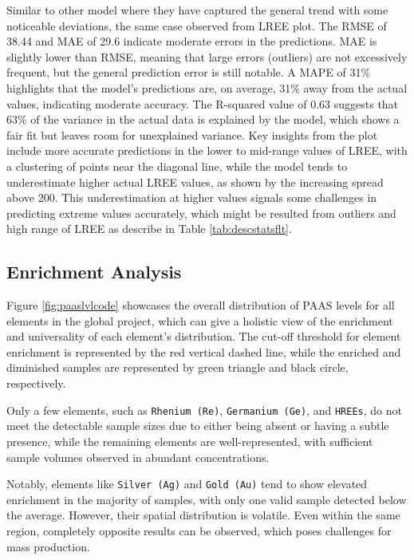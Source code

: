 \documentclass[11pt,a4paper,]{article}
\begin{document}
Similar to other model where they have captured the general trend with some noticeable deviations, the same case observed from LREE plot. The RMSE of 38.44 and MAE of 29.6 indicate moderate errors in the predictions. MAE is slightly lower than RMSE, meaning that large errors (outliers) are not excessively frequent, but the general prediction error is still notable. A MAPE of 31\% highlights that the model's predictions are, on average, 31\% away from the actual values, indicating moderate accuracy. The R-squared value of 0.63 suggests that 63\% of the variance in the actual data is explained by the model, which shows a fair fit but leaves room for unexplained variance. Key insights from the plot include more accurate predictions in the lower to mid-range values of LREE, with a clustering of points near the diagonal line, while the model tends to underestimate higher actual LREE values, as shown by the increasing spread above 200. This underestimation at higher values signals some challenges in predicting extreme values accurately, which might be resulted from outliers and high range of LREE as describe in Table \ref{tab:descstatsflt}.

\subsection{Enrichment Analysis}\label{enrichment-analysis-1}

Figure \ref{fig:paaslvlcode} showcases the overall distribution of PAAS levels for all elements in the global project, which can give a holistic view of the enrichment and universality of each element's distribution. The cut-off threshold for element enrichment is represented by the red vertical dashed line, while the enriched and diminished samples are represented by green triangle and black circle, respectively.

Only a few elements, such as \texttt{Rhenium\ (Re)}, \texttt{Germanium\ (Ge)}, and \texttt{HREEs}, do not meet the detectable sample sizes due to either being absent or having a subtle presence, while the remaining elements are well-represented, with sufficient sample volumes observed in abundant concentrations.

Notably, elements like \texttt{Silver\ (Ag)} and \texttt{Gold\ (Au)} tend to show elevated enrichment in the majority of samples, with only one valid sample detected below the average. However, their spatial distribution is volatile. Even within the same region, completely opposite results can be observed, which poses challenges for mass production.
\end{document}
